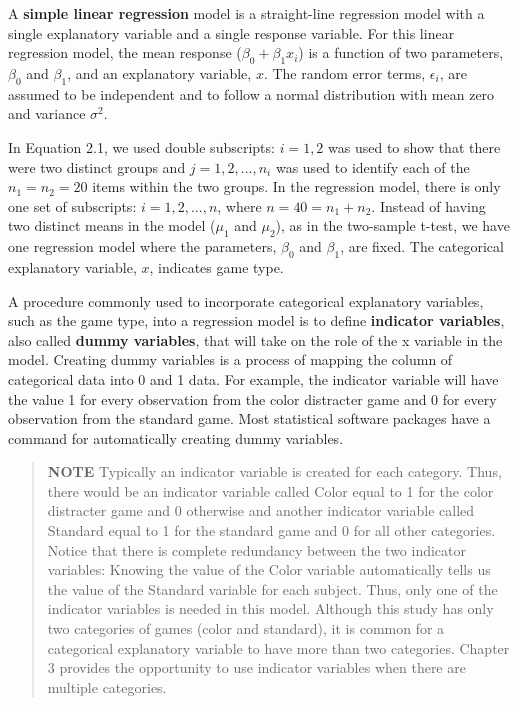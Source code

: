 \documentclass[
]{report}
\begin{document}
A \textbf{simple linear regression} model is a straight-line regression model with a single explanatory variable and a single response variable. For this linear regression model, the mean response (\(\beta_0 + \beta_1x_i\)) is a function of two parameters, \(\beta_0\) and \(\beta_1\), and an explanatory variable, \(x\). The random error terms, \(\epsilon_i\), are assumed to be independent and to follow a normal distribution with mean zero and variance \(\sigma^2\).

In Equation 2.1, we used double subscripts: \(i = 1, 2\) was used to show that there were two distinct groups and \(j = 1, 2, ... , n_i\) was used to identify each of the \(n_1 = n_2 = 20\) items within the two groups. In the regression model, there is only one set of subscripts: \(i = 1, 2, ..., n\), where \(n = 40 = n_1 + n_2\). Instead of having two distinct means in the model (\(\mu_1\) and \(\mu_2\)), as in the two-sample t-test, we have one regression model where the parameters, \(\beta_0\) and \(\beta_1\), are fixed. The categorical explanatory variable, \(x\), indicates game type.

A procedure commonly used to incorporate categorical explanatory variables, such as the game type, into a regression model is to define \textbf{indicator variables}, also called \textbf{dummy variables}, that will take on the role of the x variable in the model. Creating dummy variables is a process of mapping the column of categorical data into 0 and 1 data. For example, the indicator variable will have the value 1 for every observation from the color distracter game and 0 for every observation from the standard game. Most statistical software packages have a command for automatically creating dummy variables.

\begin{quote}
\textbf{NOTE}
Typically an indicator variable is created for each category. Thus, there would be an indicator variable called Color equal to 1 for the color distracter game and 0 otherwise and another indicator variable called Standard equal to 1 for the standard game and 0 for all other categories. Notice that there is complete redundancy between the two indicator variables: Knowing the value of the Color variable automatically tells us the value of the Standard variable for each subject. Thus, only one of the indicator variables is needed in this model. Although this study has only two categories of games (color and standard), it is common for a categorical explanatory variable to have more than two categories. Chapter 3 provides the opportunity to use indicator variables when there are multiple categories.
\end{quote}
\end{document}
